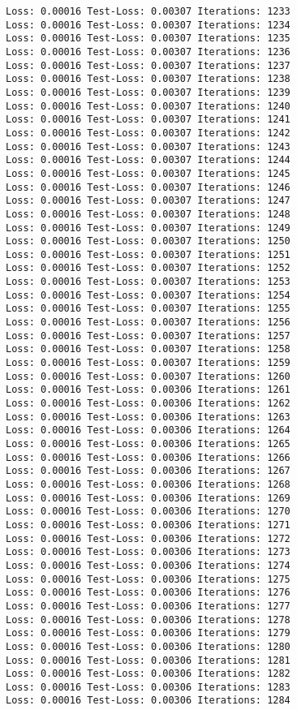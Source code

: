 \documentclass[11pt]{article}
\begin{document}
\begin{Verbatim}[commandchars=\\\{\}]
Loss: 0.00016 Test-Loss: 0.00307 Iterations: 1233
Loss: 0.00016 Test-Loss: 0.00307 Iterations: 1234
Loss: 0.00016 Test-Loss: 0.00307 Iterations: 1235
Loss: 0.00016 Test-Loss: 0.00307 Iterations: 1236
Loss: 0.00016 Test-Loss: 0.00307 Iterations: 1237
Loss: 0.00016 Test-Loss: 0.00307 Iterations: 1238
Loss: 0.00016 Test-Loss: 0.00307 Iterations: 1239
Loss: 0.00016 Test-Loss: 0.00307 Iterations: 1240
Loss: 0.00016 Test-Loss: 0.00307 Iterations: 1241
Loss: 0.00016 Test-Loss: 0.00307 Iterations: 1242
Loss: 0.00016 Test-Loss: 0.00307 Iterations: 1243
Loss: 0.00016 Test-Loss: 0.00307 Iterations: 1244
Loss: 0.00016 Test-Loss: 0.00307 Iterations: 1245
Loss: 0.00016 Test-Loss: 0.00307 Iterations: 1246
Loss: 0.00016 Test-Loss: 0.00307 Iterations: 1247
Loss: 0.00016 Test-Loss: 0.00307 Iterations: 1248
Loss: 0.00016 Test-Loss: 0.00307 Iterations: 1249
Loss: 0.00016 Test-Loss: 0.00307 Iterations: 1250
Loss: 0.00016 Test-Loss: 0.00307 Iterations: 1251
Loss: 0.00016 Test-Loss: 0.00307 Iterations: 1252
Loss: 0.00016 Test-Loss: 0.00307 Iterations: 1253
Loss: 0.00016 Test-Loss: 0.00307 Iterations: 1254
Loss: 0.00016 Test-Loss: 0.00307 Iterations: 1255
Loss: 0.00016 Test-Loss: 0.00307 Iterations: 1256
Loss: 0.00016 Test-Loss: 0.00307 Iterations: 1257
Loss: 0.00016 Test-Loss: 0.00307 Iterations: 1258
Loss: 0.00016 Test-Loss: 0.00307 Iterations: 1259
Loss: 0.00016 Test-Loss: 0.00307 Iterations: 1260
Loss: 0.00016 Test-Loss: 0.00306 Iterations: 1261
Loss: 0.00016 Test-Loss: 0.00306 Iterations: 1262
Loss: 0.00016 Test-Loss: 0.00306 Iterations: 1263
Loss: 0.00016 Test-Loss: 0.00306 Iterations: 1264
Loss: 0.00016 Test-Loss: 0.00306 Iterations: 1265
Loss: 0.00016 Test-Loss: 0.00306 Iterations: 1266
Loss: 0.00016 Test-Loss: 0.00306 Iterations: 1267
Loss: 0.00016 Test-Loss: 0.00306 Iterations: 1268
Loss: 0.00016 Test-Loss: 0.00306 Iterations: 1269
Loss: 0.00016 Test-Loss: 0.00306 Iterations: 1270
Loss: 0.00016 Test-Loss: 0.00306 Iterations: 1271
Loss: 0.00016 Test-Loss: 0.00306 Iterations: 1272
Loss: 0.00016 Test-Loss: 0.00306 Iterations: 1273
Loss: 0.00016 Test-Loss: 0.00306 Iterations: 1274
Loss: 0.00016 Test-Loss: 0.00306 Iterations: 1275
Loss: 0.00016 Test-Loss: 0.00306 Iterations: 1276
Loss: 0.00016 Test-Loss: 0.00306 Iterations: 1277
Loss: 0.00016 Test-Loss: 0.00306 Iterations: 1278
Loss: 0.00016 Test-Loss: 0.00306 Iterations: 1279
Loss: 0.00016 Test-Loss: 0.00306 Iterations: 1280
Loss: 0.00016 Test-Loss: 0.00306 Iterations: 1281
Loss: 0.00016 Test-Loss: 0.00306 Iterations: 1282
Loss: 0.00016 Test-Loss: 0.00306 Iterations: 1283
Loss: 0.00016 Test-Loss: 0.00306 Iterations: 1284

\end{Verbatim}
\end{document}
